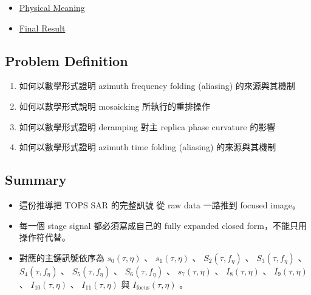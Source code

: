 \documentclass[10pt]{article}
\providecommand{\tightlist}{%
  \setlength{\itemsep}{0pt}\setlength{\parskip}{0pt}}
\begin{document}
\begin{itemize}
\begin{itemize}
    \begin{itemize}
    \tightlist
    \item
      \protect\hyperlink{51-azimuth-time-folding-explain}{5.1. Azimuth
      Time Folding (Explain)}
    \item
      \protect\hyperlink{52-mosaicking}{5.2. Mosaicking}
    \item
      \protect\hyperlink{53-deramping}{5.3. Deramping}
    \item
      \protect\hyperlink{54-low-pass-filter}{5.4. Low Pass Filter}
    \item
      \protect\hyperlink{55-reramping}{5.5. Reramping}
    \end{itemize}
  \item
    \protect\hyperlink{6-focused-image}{6. Focused Image}
  \end{itemize}
\item
  \protect\hyperlink{physical-meaning}{Physical Meaning}
\item
  \protect\hyperlink{final-result}{Final Result}
\end{itemize}

\hypertarget{problem-definition}{%
\subsection{Problem Definition}\label{problem-definition}}

\begin{enumerate}
\def\labelenumi{\arabic{enumi}.}
\tightlist
\item
  如何以數學形式證明 azimuth frequency folding (aliasing) 的來源與其機制
\item
  如何以數學形式說明 mosaicking 所執行的重排操作
\item
  如何以數學形式證明 deramping 對主 replica phase curvature 的影響
\item
  如何以數學形式證明 azimuth time folding (aliasing) 的來源與其機制
\end{enumerate}

\hypertarget{summary}{%
\subsection{Summary}\label{summary}}

\begin{itemize}
\tightlist
\item
  這份推導把 TOPS SAR 的完整訊號 從 raw data 一路推到 focused image。
\item
  每一個 stage signal 都必須寫成自己的 fully expanded closed
  form，不能只用操作符代替。
\item
  對應的主鏈訊號依序為 \(s_0(\tau,\eta)\) 、 \(s_1(\tau,\eta)\) 、
  \(S_2(\tau,f_\eta)\) 、 \(S_3(\tau,f_\eta)\) 、 \(S_4(\tau,f_\eta)\)
  、 \(S_5(\tau,f_\eta)\) 、 \(S_6(\tau,f_\eta)\) 、 \(s_7(\tau,\eta)\)
  、 \(I_8(\tau,\eta)\) 、 \(I_9(\tau,\eta)\) 、 \(I_{10}(\tau,\eta)\)
  、 \(I_{11}(\tau,\eta)\) 與 \(I_{\mathrm{focus}}(\tau,\eta)\) 。
\end{itemize}
\end{document}
